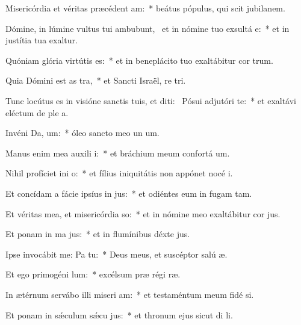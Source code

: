 \item Misericórdia et véritas præcédent  am:~* beátus pópulus, qui scit jubilanem.
\item Dómine, in lúmine vultus tui ambubunt,~\pscross{} et in nómine tuo exsultá  e:~* et in justítia tua exaltur.
\item Quóniam glória virtútis   es:~* et in beneplácito tuo exaltábitur cor trum.
\item Quia Dómini est as tra,~* et Sancti Israël, re tri.
\item Tunc locútus es in visióne sanctis tuis, et diti:~\pscross{} Pósui adjutóri  te:~* et exaltávi eléctum de ple a.
\item Invéni Da,  um:~* óleo sancto meo un um.
\item Manus enim mea auxili i:~* et bráchium meum confortá um.
\item Nihil profíciet ini  o:~* et fílius iniquitátis non appónet nocé i.
\item Et concídam a fácie ipsíus in jus:~* et odiéntes eum in fugam tam.
\item Et véritas mea, et misericórdia   so:~* et in nómine meo exaltábitur cor jus.
\item Et ponam in ma  jus:~* et in flumínibus déxte jus.
\item Ipse invocábit me: Pa   tu:~* Deus meus, et suscéptor salú æ.
\item Et ego primogéni  lum:~* excélsum præ régi ræ.
\item In ætérnum servábo illi miseri am:~* et testaméntum meum fidé si.
\item Et ponam in sǽculum sǽcu  jus:~* et thronum ejus sicut di li.
